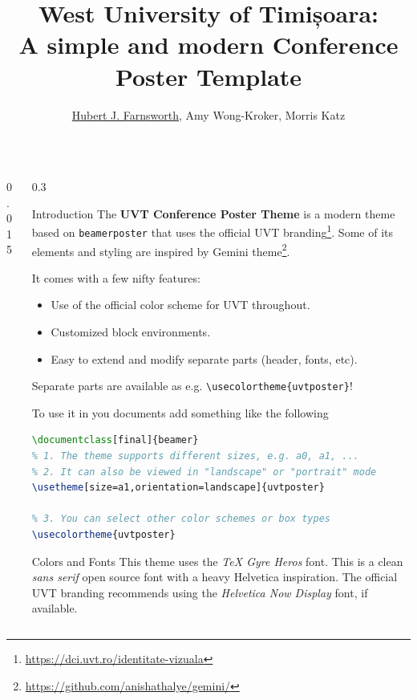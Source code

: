 \documentclass[final]{beamer}
\title{West University of Timișoara: \\ A simple and modern Conference Poster Template}
\author{\underline{Hubert J. Farnsworth}\inst{1}, Amy Wong-Kroker\inst{2}, Morris Katz\inst{2}}
\institute[shortinst]{\inst{1} Academy of Science, New New York, \inst{2} Mars University}
\begin{document}
\begin{frame}[fragile]

\begin{columns}[t]
\begin{column}{0.015\paperwidth}\end{column}

\begin{column}{0.3\paperwidth}

\begin{block}{Introduction}
    The \textbf{UVT Conference Poster Theme} is a modern theme based on
    \texttt{beamerposter} that uses the official
    \textcolor{UVTLightBlue}{UVT branding}\footnote{\url{https://dci.uvt.ro/identitate-vizuala}}. Some
    of its elements and styling are inspired by \textcolor{UVTLightBlue}{Gemini}
    theme\footnote{\url{https://github.com/anishathalye/gemini/}}.

    It comes with a few nifty features:
    \begin{itemize}
        \item Use of the official color scheme for UVT throughout.
        \item Customized block environments.
        \item Easy to extend and modify separate parts (header, fonts, etc).
    \end{itemize}

    Separate parts are available as e.g. \texttt{\textbackslash usecolortheme\{uvtposter\}}!

    To use it in you documents add something like the following

{
\centering
\begin{lstlisting}[language=TeX]
\documentclass[final]{beamer}
% 1. The theme supports different sizes, e.g. a0, a1, ...
% 2. It can also be viewed in "landscape" or "portrait" mode
\usetheme[size=a1,orientation=landscape]{uvtposter}

% 3. You can select other color schemes or box types
\usecolortheme{uvtposter}
\end{lstlisting}
}
\end{block}

\begin{block}{Colors and Fonts}
    This theme uses the \emph{TeX Gyre Heros} font. This is a clean \emph{sans serif}
    open source font with a heavy Helvetica inspiration. The official UVT branding
    recommends using the \emph{Helvetica Now Display} font, if available.


\end{block}
\end{column}
\end{columns}
\end{frame}
\end{document}
